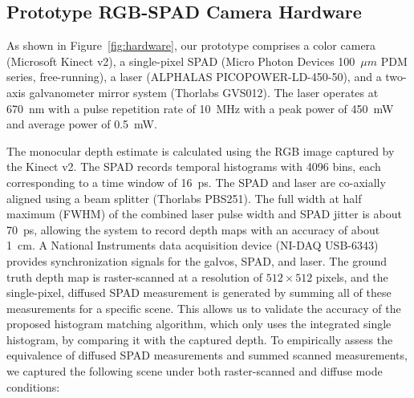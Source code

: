 
\subsection{Prototype RGB-SPAD Camera Hardware}


As shown in Figure~\ref{fig:hardware}, our prototype comprises a color camera
(Microsoft Kinect v2), a single-pixel SPAD (Micro Photon Devices 100~$\mu m$ PDM
series, free-running), a laser (ALPHALAS PICOPOWER-LD-450-50), and a two-axis
galvanometer mirror system (Thorlabs GVS012). The laser operates at 670~nm with
a pulse repetition rate of 10~MHz with a peak power of 450~mW and average power
of 0.5~mW.

The monocular depth estimate is calculated
using the RGB image captured by the Kinect v2.
The SPAD records temporal histograms with 4096 bins, each corresponding to a
time window of 16~ps. The SPAD and laser are co-axially aligned using a beam
splitter (Thorlabs PBS251). The full width at half maximum (FWHM) of the
combined laser pulse width and SPAD jitter is about 70~ps, allowing the system
to record depth maps with an accuracy of about 1~cm. A National Instruments data
acquisition device (NI-DAQ USB-6343) provides synchronization signals for the
galvos, SPAD, and laser. The ground truth depth map is raster-scanned at a
resolution of $512 \times 512$ pixels, and the single-pixel, diffused SPAD
measurement is generated by summing all of these measurements for a specific
scene. This allows us to validate the accuracy of the proposed histogram
matching algorithm, which only uses the integrated single histogram, by
comparing it with the captured depth. To empirically assess the equivalence of
diffused SPAD measurements and summed scanned measurements, we captured the
following scene under both raster-scanned and diffuse mode conditions:


